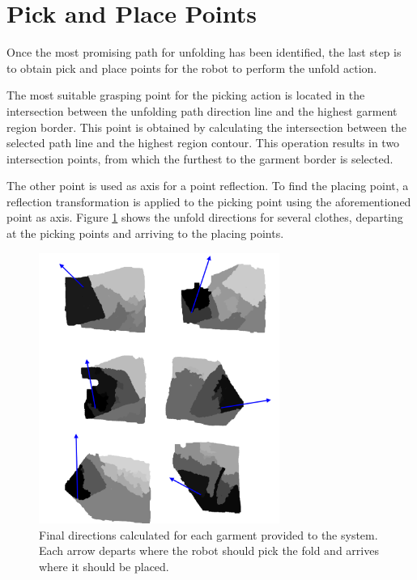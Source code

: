 \section{Pick and Place Points}
\label{pick_and_place}
Once the most promising path for unfolding has been identified, the last step is to obtain pick and place points for the robot to perform the unfold action.


The most suitable grasping point for the picking action is located in the  intersection between the unfolding path direction line and the highest garment region border. This point is obtained by calculating the intersection between the selected path line and the highest region contour. This operation results in two intersection points, from which the furthest to the garment border is selected.

The other point is used as axis for a point reflection. To find the placing point, a reflection transformation is applied to the picking point using the aforementioned point as axis. Figure \ref{fig:directions} shows the unfold directions for several clothes, departing at the picking points and arriving to the placing points.

\begin{figure}[thpb]
    \centering
    \includegraphics[width=0.7\textwidth]{figures/directions.pdf}
    \caption{Final directions calculated for each garment provided to the system. Each arrow departs where the robot should pick the fold and arrives where it should be placed.}
    \label{fig:directions}
\end{figure}